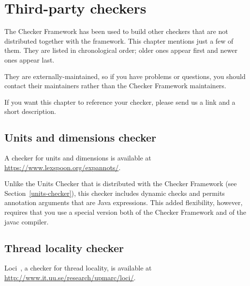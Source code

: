 \htmlhr
\chapter{Third-party checkers\label{third-party-checkers}\label{external-checkers}}

The Checker Framework has been used to build other checkers that are not
distributed together with the framework.  This chapter mentions just a few
of them.  They are listed in chronological order; older ones appear first
and newer ones appear last.

They are externally-maintained, so if you have problems or questions, you
should contact their maintainers rather than the Checker Framework
maintainers.

If you want this chapter to reference your checker,
please send us a link and a short description.







\section{Units and dimensions checker\label{units-and-dimensions-checker}}

A checker for units and dimensions is available at
\url{https://www.lexspoon.org/expannots/}.

Unlike the Units Checker that is distributed with the Checker Framework
(see Section~\ref{units-checker}), this checker includes dynamic checks and
permits annotation arguments that are Java expressions.  This added
flexibility, however, requires that you use a special version both of the
Checker Framework and of the javac compiler.


\section{Thread locality checker\label{loci-thread-locality-checker}}

Loci~\cite{WrigstadPMZV2009}, a checker for thread locality, is available at
\url{http://www.it.uu.se/research/upmarc/loci/}.



